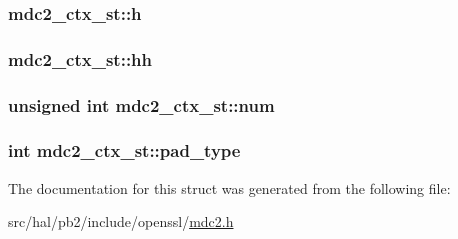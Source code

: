 \subsubsection[{\texorpdfstring{h}{h}}]{ mdc2\+\_\+ctx\+\_\+st\+::h}\hypertarget{structmdc2__ctx__st_affcbad02a87a1e029e62afafc4d587de}{}\label{structmdc2__ctx__st_affcbad02a87a1e029e62afafc4d587de}
\subsubsection[{\texorpdfstring{hh}{hh}}]{ mdc2\+\_\+ctx\+\_\+st\+::hh}\hypertarget{structmdc2__ctx__st_afd6b835d0ca4e70e3b046bd88c10aa8b}{}\label{structmdc2__ctx__st_afd6b835d0ca4e70e3b046bd88c10aa8b}
\subsubsection[{\texorpdfstring{num}{num}}]{\setlength{\rightskip}{0pt plus 5cm}unsigned int mdc2\+\_\+ctx\+\_\+st\+::num}\hypertarget{structmdc2__ctx__st_af85d040e72cfb4508023fb0ea68fcd77}{}\label{structmdc2__ctx__st_af85d040e72cfb4508023fb0ea68fcd77}
\subsubsection[{\texorpdfstring{pad\+\_\+type}{pad_type}}]{\setlength{\rightskip}{0pt plus 5cm}int mdc2\+\_\+ctx\+\_\+st\+::pad\+\_\+type}\hypertarget{structmdc2__ctx__st_a98ad50463fcdc70534875520374dd08d}{}\label{structmdc2__ctx__st_a98ad50463fcdc70534875520374dd08d}


The documentation for this struct was generated from the following file\+:\begin{DoxyCompactItemize}
\item 
src/hal/pb2/include/openssl/\hyperlink{mdc2_8h}{mdc2.\+h}\end{DoxyCompactItemize}
